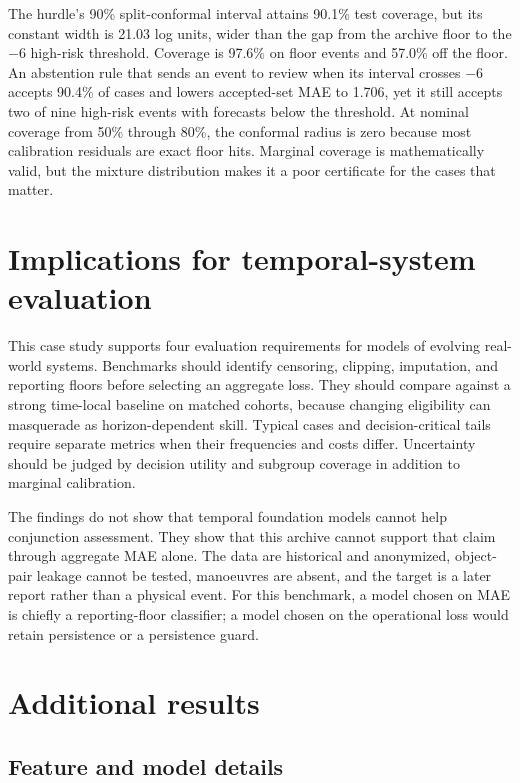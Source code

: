 \documentclass{article}
\begin{document}
The hurdle's 90\% split-conformal interval attains 90.1\% test coverage, but its constant width is 21.03 log units, wider than the gap from the archive floor to the $-6$ high-risk threshold. Coverage is 97.6\% on floor events and 57.0\% off the floor. An abstention rule that sends an event to review when its interval crosses $-6$ accepts 90.4\% of cases and lowers accepted-set MAE to 1.706, yet it still accepts two of nine high-risk events with forecasts below the threshold. At nominal coverage from 50\% through 80\%, the conformal radius is zero because most calibration residuals are exact floor hits. Marginal coverage is mathematically valid, but the mixture distribution makes it a poor certificate for the cases that matter.

\section{Implications for temporal-system evaluation}

This case study supports four evaluation requirements for models of evolving real-world systems. Benchmarks should identify censoring, clipping, imputation, and reporting floors before selecting an aggregate loss. They should compare against a strong time-local baseline on matched cohorts, because changing eligibility can masquerade as horizon-dependent skill. Typical cases and decision-critical tails require separate metrics when their frequencies and costs differ. Uncertainty should be judged by decision utility and subgroup coverage in addition to marginal calibration.

The findings do not show that temporal foundation models cannot help conjunction assessment. They show that this archive cannot support that claim through aggregate MAE alone. The data are historical and anonymized, object-pair leakage cannot be tested, manoeuvres are absent, and the target is a later report rather than a physical event. For this benchmark, a model chosen on MAE is chiefly a reporting-floor classifier; a model chosen on the operational loss would retain persistence or a persistence guard.

\clearpage



\appendix

\section{Additional results}

\subsection{Feature and model details}
\end{document}
